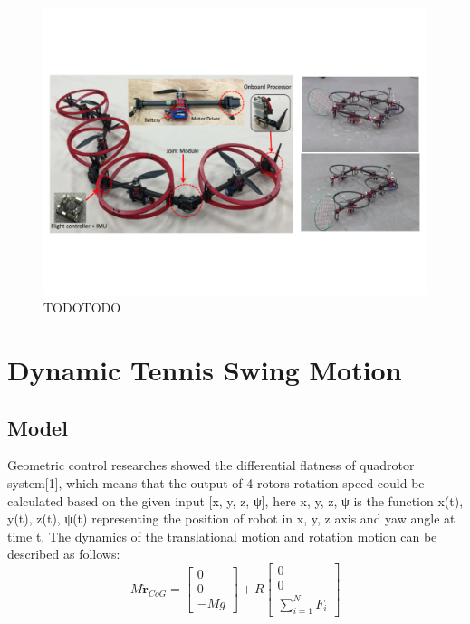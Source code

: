 \documentclass{jarticle}
\begin{document}
\begin{figure}[htb]
  \centering
  \includegraphics[clip, bb= 10 128 777 457,  width=\columnwidth]{figs_orig/figure.pdf}
  \caption{TODOTODO}
  \label{fig:abst-image}
\end{figure}

\section{Dynamic Tennis Swing Motion}

\subsection{Model}
Geometric control researches showed the differential flatness of quadrotor  system[1], which means that the output of 4 rotors rotation speed could be calculated based on the given input [x, y, z, ψ], here x, y, z, ψ is the function x(t), y(t), z(t), ψ(t)  representing the position of robot in x, y, z axis and yaw angle at time t.
The dynamics of the translational motion and rotation motion can be described as follows:
\begin{equation}
  \label{eq:model1}
  M\bm{\ddot{r}}_{CoG} =\left[ \begin{array}{c}
      0 \\
      0 \\
      -Mg
    \end{array}\right]
    + R \left[ \begin{array}{c}
        0 \\
        0 \\
        \sum_{i=1}^{N} F_i
      \end{array}\right]
\end{equation}
\end{document}
